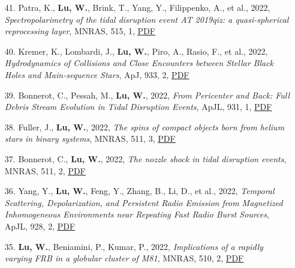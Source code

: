 \begin{itemize}[leftmargin=0.65cm]
\vspace{-0.1cm}
\item[41.]{Patra, K., {\bf Lu, W.}, Brink, T., Yang, Y., Filippenko, A., et al., 2022, {\it Spectropolarimetry of the tidal disruption event AT 2019qiz: a quasi-spherical reprocessing layer}, MNRAS, 515, 1, \href{https://ui.adsabs.harvard.edu/abs/2022MNRAS.515..138P}{\underline{PDF}}}

\vspace{-0.1cm}
\item[40.]{Kremer, K., Lombardi, J., {\bf Lu, W.}, Piro, A., Rasio, F., et al., 2022, {\it Hydrodynamics of Collisions and Close Encounters between Stellar Black Holes and Main-sequence Stars}, ApJ, 933, 2, \href{https://ui.adsabs.harvard.edu/abs/2022ApJ...933..203K}{\underline{PDF}}}

\vspace{-0.1cm}
\item[39.]{Bonnerot, C., Pessah, M., {\bf Lu, W.}, 2022, {\it From Pericenter and Back: Full Debris Stream Evolution in Tidal Disruption Events}, ApJL, 931, 1, \href{https://ui.adsabs.harvard.edu/abs/2022ApJ...931L...6B}{\underline{PDF}}}

\vspace{-0.1cm}
\item[38.]{Fuller, J., {\bf Lu, W.}, 2022, {\it The spins of compact objects born from helium stars in binary systems}, MNRAS, 511, 3, \href{https://ui.adsabs.harvard.edu/abs/2022MNRAS.511.3951F}{\underline{PDF}}}

\vspace{-0.1cm}
\item[37.]{Bonnerot, C., {\bf Lu, W.}, 2022, {\it The nozzle shock in tidal disruption events}, MNRAS, 511, 2, \href{https://ui.adsabs.harvard.edu/abs/2022MNRAS.511.2147B}{\underline{PDF}}}

\vspace{-0.1cm}
\item[36.]{Yang, Y., {\bf Lu, W.}, Feng, Y., Zhang, B., Li, D., et al., 2022, {\it Temporal Scattering, Depolarization, and Persistent Radio Emission from Magnetized Inhomogeneous Environments near Repeating Fast Radio Burst Sources}, ApJL, 928, 2, \href{https://ui.adsabs.harvard.edu/abs/2022ApJ...928L..16Y}{\underline{PDF}}}

\vspace{-0.1cm}
\item[35.]{{\bf Lu, W.}, Beniamini, P., Kumar, P., 2022, {\it Implications of a rapidly varying FRB in a globular cluster of M81}, MNRAS, 510, 2, \href{https://ui.adsabs.harvard.edu/abs/2022MNRAS.510.1867L}{\underline{PDF}}}


\end{itemize}
